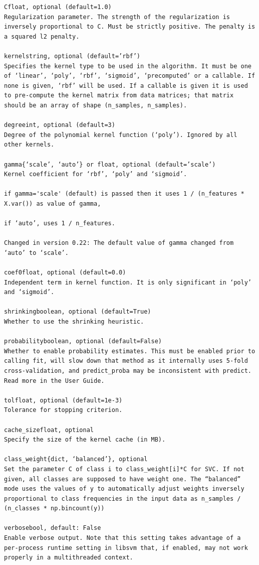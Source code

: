 \documentclass[12pt]{article}
\begin{document}
\begin{verbatim}
Cfloat, optional (default=1.0)
Regularization parameter. The strength of the regularization is inversely proportional to C. Must be strictly positive. The penalty is a squared l2 penalty.

kernelstring, optional (default=’rbf’)
Specifies the kernel type to be used in the algorithm. It must be one of ‘linear’, ‘poly’, ‘rbf’, ‘sigmoid’, ‘precomputed’ or a callable. If none is given, ‘rbf’ will be used. If a callable is given it is used to pre-compute the kernel matrix from data matrices; that matrix should be an array of shape (n_samples, n_samples).

degreeint, optional (default=3)
Degree of the polynomial kernel function (‘poly’). Ignored by all other kernels.

gamma{‘scale’, ‘auto’} or float, optional (default=’scale’)
Kernel coefficient for ‘rbf’, ‘poly’ and ‘sigmoid’.

if gamma='scale' (default) is passed then it uses 1 / (n_features * X.var()) as value of gamma,

if ‘auto’, uses 1 / n_features.

Changed in version 0.22: The default value of gamma changed from ‘auto’ to ‘scale’.

coef0float, optional (default=0.0)
Independent term in kernel function. It is only significant in ‘poly’ and ‘sigmoid’.

shrinkingboolean, optional (default=True)
Whether to use the shrinking heuristic.

probabilityboolean, optional (default=False)
Whether to enable probability estimates. This must be enabled prior to calling fit, will slow down that method as it internally uses 5-fold cross-validation, and predict_proba may be inconsistent with predict. Read more in the User Guide.

tolfloat, optional (default=1e-3)
Tolerance for stopping criterion.

cache_sizefloat, optional
Specify the size of the kernel cache (in MB).

class_weight{dict, ‘balanced’}, optional
Set the parameter C of class i to class_weight[i]*C for SVC. If not given, all classes are supposed to have weight one. The “balanced” mode uses the values of y to automatically adjust weights inversely proportional to class frequencies in the input data as n_samples / (n_classes * np.bincount(y))

verbosebool, default: False
Enable verbose output. Note that this setting takes advantage of a per-process runtime setting in libsvm that, if enabled, may not work properly in a multithreaded context.


\end{verbatim}
\end{document}

